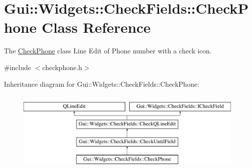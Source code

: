 \hypertarget{classGui_1_1Widgets_1_1CheckFields_1_1CheckPhone}{\section{Gui\-:\-:Widgets\-:\-:Check\-Fields\-:\-:Check\-Phone Class Reference}
\label{classGui_1_1Widgets_1_1CheckFields_1_1CheckPhone}
}


The \hyperlink{classGui_1_1Widgets_1_1CheckFields_1_1CheckPhone}{Check\-Phone} class Line Edit of Phone number with a check icon.  




{\ttfamily \#include $<$checkphone.\-h$>$}

Inheritance diagram for Gui\-:\-:Widgets\-:\-:Check\-Fields\-:\-:Check\-Phone\-:\begin{figure}[H]
\begin{center}
\leavevmode
\includegraphics[height=4.000000cm]{da/dc0/classGui_1_1Widgets_1_1CheckFields_1_1CheckPhone}
\end{center}
\end{figure}
